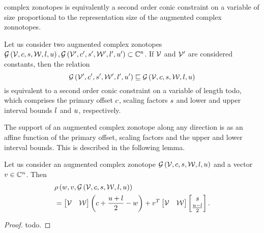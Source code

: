 complex zonotopes is equivalently a second order conic constraint on a
variable of size proportional to the representation size of the
augmented complex zonnotopes.
%
\begin{proposition}
Let us consider two augmented complex zonotopes\\
$\mathcal{G}\left(\mathcal{V},c,s,\mathcal{W},l,u\right),
\mathcal{G}\left(\mathcal{V}^\prime,c^\prime,s^\prime,\mathcal{W}^\prime,l^\prime,u^\prime\right)\subset\mathbb{C}^n$.
If $\mathcal{V}$ and $\mathcal{V}^\prime$ are considered constants, then the
relation
%
\[
\mathcal{G}\left(\mathcal{V}^\prime,c^\prime,s^\prime,\mathcal{W}^\prime,l^\prime,u^\prime\right) \sqsubseteq
 \mathcal{G}\left(\mathcal{V},c,s,\mathcal{W},l,u\right)
\]
%
is equivalent to a second order conic constraint on a variable of
length {\color{red} todo}, which comprises the primary offset $c$, scaling
factors $s$ and lower and upper interval bounds $l$ and $u$,
respectively.
\end{proposition}
%
The support of an augmented complex zonotope along any direction is as
an affine function of the primary offset, scaling factors and the
upper and lower interval bounds.  This is described in the following
lemma.
%
\begin{lemma}
Let us consider an augmented complex zonotope
$\mathcal{G}\left(\mathcal{V},c,s,\mathcal{W},l,u\right)$ and a vector
$v\in\mathbb{C}^n$.  Then
%
\begin{align*}
  & \rho\left(w,v,\mathcal{G}\left(\mathcal{V},c,s,\mathcal{W},l,u\right)\right)\\
  & = \left[\begin{matrix}\mathcal{V} &
    \mathcal{W}\end{matrix}\right]\left(c+\frac{u+l}{2}-w\right)+v^T\left[\begin{matrix}\mathcal{V} & \mathcal{W}\end{matrix}\right]\left[\begin{matrix}s\\\frac{u-l}{2}\end{matrix}\right].
\end{align*}
%
\end{lemma}
%
\begin{proof}
{\color{red} todo}.
\end{proof}
%



